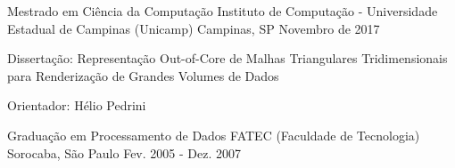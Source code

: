\begin{cventries}
  \cventry
    {Mestrado em Ciência da Computação}
    {Instituto de Computação - Universidade Estadual de Campinas (Unicamp)}
    {Campinas, SP}
    {Novembro de 2017}
    {
      \begin{cvitems}
      \item Dissertação: Representação Out-of-Core de Malhas Triangulares Tridimensionais para Renderização de Grandes Volumes de Dados
      \item{Orientador: Hélio Pedrini}
  \end{cvitems}
}
  \cventry
    {Graduação em Processamento de Dados}
    {FATEC (Faculdade de Tecnologia)}
    {Sorocaba, São Paulo}
    {Fev. 2005 - Dez. 2007}
    {}

\end{cventries}
